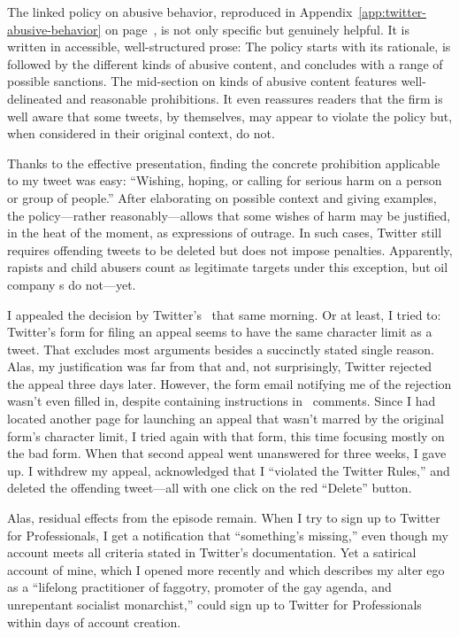 \noindent{}The linked policy on abusive behavior, reproduced in
Appendix~\ref{app:twitter-abusive-behavior} on
page~\pageref{app:twitter-abusive-behavior}, is not only specific but genuinely
helpful. It is written in accessible, well-structured prose: The policy starts
with its rationale, is followed by the different kinds of abusive content, and
concludes with a range of possible sanctions. The mid-section on kinds of
abusive content features well-delineated and reasonable prohibitions. It even
reassures readers that the firm is well aware that some tweets, by themselves,
may appear to violate the policy but, when considered in their original context,
do not.

Thanks to the effective presentation, finding the concrete prohibition
applicable to my tweet was easy: ``Wishing, hoping, or calling for serious harm
on a person or group of people.'' After elaborating on possible context and
giving examples, the policy---rather reasonably---allows that some wishes of
harm may be justified, in the heat of the moment, as expressions of outrage. In
such cases, Twitter still requires offending tweets to be deleted but does not
impose penalties. Apparently, rapists and child abusers count as legitimate
targets under this exception, but oil company \CEO{}s do not---yet.

I appealed the decision by Twitter's \AI\ that same morning. Or at least, I
tried to: Twitter's form for filing an appeal seems to have the same character
limit as a tweet. That excludes most arguments besides a succinctly stated
single reason. Alas, my justification was far from that and, not surprisingly,
Twitter rejected the appeal three days later. However, the form email notifying
me of the rejection wasn't even filled in, despite containing instructions in
\HTML\ comments. Since I had located another page for launching an appeal that
wasn't marred by the original form's character limit, I tried again with that
form, this time focusing mostly on the bad form. When that second appeal went
unanswered for three weeks, I gave up. I withdrew my appeal, acknowledged that I
``violated the Twitter Rules,'' and deleted the offending tweet---all with one
click on the red ``Delete'' button.

Alas, residual effects from the episode remain. When I try to sign up to Twitter
for Professionals, I get a notification that ``something's missing,'' even
though my account meets all criteria stated in Twitter's documentation. Yet a
satirical account of mine, which I opened more recently and which describes my
alter ego as a ``lifelong practitioner of faggotry, promoter of the gay agenda,
and unrepentant socialist monarchist,'' could sign up to Twitter for
Professionals within days of account creation.


